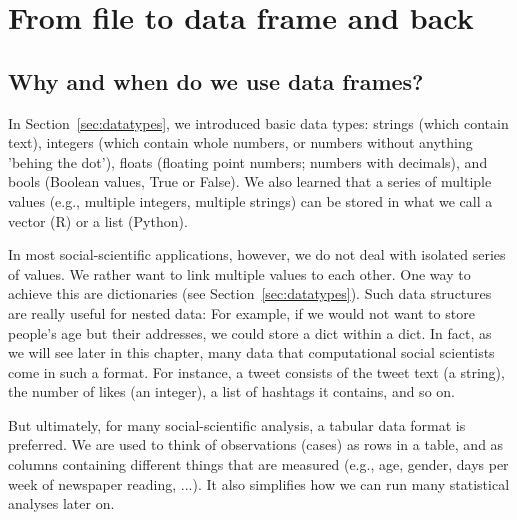\chapter{From file to data frame and back}


\section{Why and when do we use data frames?}

In Section~\ref{sec:datatypes}, we introduced basic data types: strings (which contain text), integers (which contain whole numbers, or numbers without anything 'behing the dot'), floats (floating point numbers; numbers with decimals), and bools (Boolean values, True or False). 
We also learned that a series of multiple values (e.g., multiple integers, multiple strings) can be stored in what we call a vector (R) or a list (Python).

In most social-scientific applications, however, we do not deal with isolated series of values. We rather want to link multiple values to each other. One way to achieve this are dictionaries (see Section~\ref{sec:datatypes}).
Such data structures are really useful for nested data: For example, if we would not want to store people's age but their addresses, we could store a dict within a dict.
In fact, as we will see later in this chapter, many data that computational social scientists come in such a format. For instance, a tweet consists of the tweet text (a string), the number of likes (an integer), a list of hashtags it contains, and so on.

But ultimately, for many social-scientific analysis, a tabular data format is preferred. We are used to think of observations (cases) as rows in a table, and as columns containing different things that are measured (e.g., age, gender, days per week of newspaper reading, ...). It also simplifies how we can run many statistical analyses later on.

